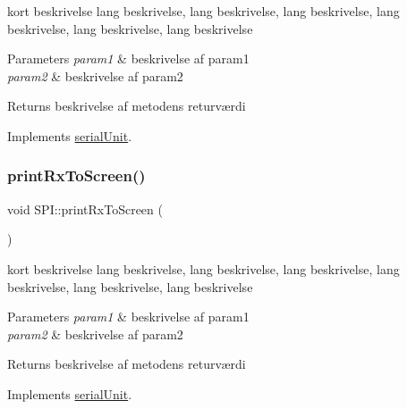 kort beskrivelse lang beskrivelse, lang beskrivelse, lang beskrivelse, lang beskrivelse, lang beskrivelse, lang beskrivelse 


\begin{DoxyParams}{Parameters}
{\em param1} & beskrivelse af param1 \\
\hline
{\em param2} & beskrivelse af param2 \\
\hline
\end{DoxyParams}
\begin{DoxyReturn}{Returns}
beskrivelse af metodens returværdi 
\end{DoxyReturn}


Implements \hyperlink{classserialUnit_a88db4b94632c6ab70933bb32f105821d}{serial\+Unit}.

\mbox{\label{classSPI_a33d7fcfab7e5962dd1392aecfd58eaca}} 
\subsubsection{\texorpdfstring{print\+Rx\+To\+Screen()}{printRxToScreen()}}
{\footnotesize\ttfamily void S\+P\+I\+::print\+Rx\+To\+Screen (\begin{DoxyParamCaption}{ }\end{DoxyParamCaption})\hspace{0.3cm}{\ttfamily [virtual]}}



kort beskrivelse lang beskrivelse, lang beskrivelse, lang beskrivelse, lang beskrivelse, lang beskrivelse, lang beskrivelse 


\begin{DoxyParams}{Parameters}
{\em param1} & beskrivelse af param1 \\
\hline
{\em param2} & beskrivelse af param2 \\
\hline
\end{DoxyParams}
\begin{DoxyReturn}{Returns}
beskrivelse af metodens returværdi 
\end{DoxyReturn}


Implements \hyperlink{classserialUnit_a3d529e2d2c5908ecf8106ff796e4c3eb}{serial\+Unit}.

\mbox{\label{classSPI_a54c4ecb02366f1e31d2e6f4aa6db8f7d}} 
